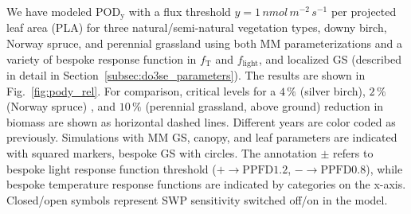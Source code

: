 \documentclass[bg, manuscript]{copernicus}
\begin{document}
We have modeled $\mathrm{POD_y}$ with a flux threshold $y=1\,\unit{nmol\,m^{-2}\,s^{-1}}$ per projected leaf area (PLA) for three natural/semi-natural vegetation types, downy birch, Norway spruce, and perennial grassland using both MM parameterizations and a variety of bespoke response function in $f_\mathrm{T}$ and $f_\mathrm{light}$, and localized GS (described in detail in Section~\ref{subsec:do3se_parameters}). The results are shown in Fig.~\ref{fig:pody_rel}. For comparison, critical levels for a $4\,\unit{\%}$ (silver birch), $2\,\unit{\%}$ (Norway spruce) \citep{ICP:MappingManual2017}, and $10\,\unit{\%}$ (perennial grassland, above ground) \citep{ESPR:Hayes2021} reduction in biomass are shown as horizontal dashed lines. Different years are color coded as previously. Simulations with MM GS, canopy, and leaf parameters are indicated with squared markers, bespoke GS with circles. The annotation $\pm$ refers to bespoke light response function threshold ($+\rightarrow\mathrm{PPFD1.2}$, $-\rightarrow\mathrm{PPFD0.8}$), while bespoke temperature response functions are indicated by categories on the x-axis. Closed/open symbols represent SWP sensitivity switched off/on in the model.
\end{document}
